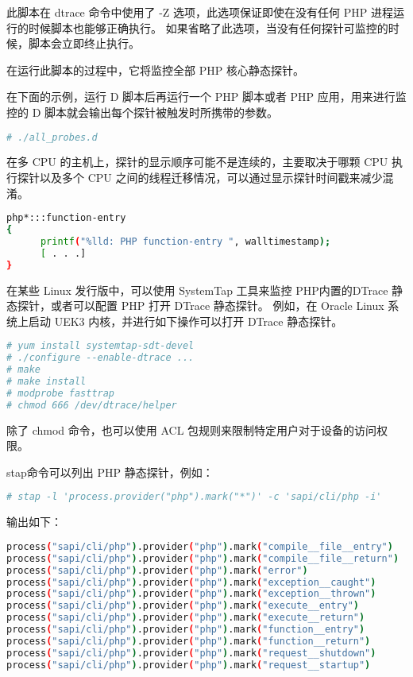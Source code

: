 此脚本在 dtrace 命令中使用了 -Z 选项，此选项保证即使在没有任何 PHP 进程运行的时候脚本也能够正确执行。 如果省略了此选项，当没有任何探针可监控的时候，脚本会立即终止执行。

在运行此脚本的过程中，它将监控全部 PHP 核心静态探针。 

在下面的示例，运行 D 脚本后再运行一个 PHP 脚本或者 PHP 应用，用来进行监控的 D 脚本就会输出每个探针被触发时所携带的参数。

\begin{lstlisting}[language=bash]
# ./all_probes.d
\end{lstlisting}

在多 CPU 的主机上，探针的显示顺序可能不是连续的，主要取决于哪颗 CPU 执行探针以及多个 CPU 之间的线程迁移情况，可以通过显示探针时间戳来减少混淆。

\begin{lstlisting}[language=bash]
php*:::function-entry
{
      printf("%lld: PHP function-entry ", walltimestamp);
      [ . . .]
}
\end{lstlisting}

在某些 Linux 发行版中，可以使用 SystemTap 工具来监控 PHP内置的DTrace 静态探针，或者可以配置 PHP 打开 DTrace 静态探针。 例如，在 Oracle Linux 系统上启动 UEK3 内核，并进行如下操作可以打开 DTrace 静态探针。

\begin{lstlisting}[language=bash]
# yum install systemtap-sdt-devel
# ./configure --enable-dtrace ...
# make
# make install
# modprobe fasttrap
# chmod 666 /dev/dtrace/helper
\end{lstlisting}

除了 chmod 命令，也可以使用 ACL 包规则来限制特定用户对于设备的访问权限。

stap命令可以列出 PHP 静态探针，例如：


\begin{lstlisting}[language=bash]
# stap -l 'process.provider("php").mark("*")' -c 'sapi/cli/php -i'
\end{lstlisting}

输出如下：

\begin{lstlisting}[language=bash]
process("sapi/cli/php").provider("php").mark("compile__file__entry")
process("sapi/cli/php").provider("php").mark("compile__file__return")
process("sapi/cli/php").provider("php").mark("error")
process("sapi/cli/php").provider("php").mark("exception__caught")
process("sapi/cli/php").provider("php").mark("exception__thrown")
process("sapi/cli/php").provider("php").mark("execute__entry")
process("sapi/cli/php").provider("php").mark("execute__return")
process("sapi/cli/php").provider("php").mark("function__entry")
process("sapi/cli/php").provider("php").mark("function__return")
process("sapi/cli/php").provider("php").mark("request__shutdown")
process("sapi/cli/php").provider("php").mark("request__startup")
\end{lstlisting}


